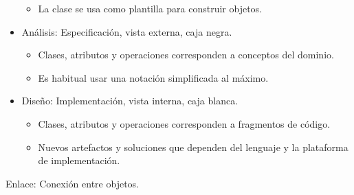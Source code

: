 \documentclass[12pt, twoside, openright]{report} %
\begin{document}
\begin{itemize}
      \begin{itemize}
      
      \item
        La clase se usa como plantilla para construir objetos.
      \end{itemize}
    \item
      Análisis: Especificación, vista externa, caja negra.

      \begin{itemize}
      
      \item
        Clases, atributos y operaciones corresponden a conceptos del
        dominio.
      \item
        Es habitual usar una notación simplificada al máximo.
      \end{itemize}
    \item
      Diseño: Implementación, vista interna, caja blanca.

      \begin{itemize}
      
      \item
        Clases, atributos y operaciones corresponden a fragmentos de
        código.
      \item
        Nuevos artefactos y soluciones que dependen del lenguaje y la
        plataforma de implementación.
      \end{itemize}
    \end{itemize}

	Enlace: Conexión entre objetos.
\end{document}
